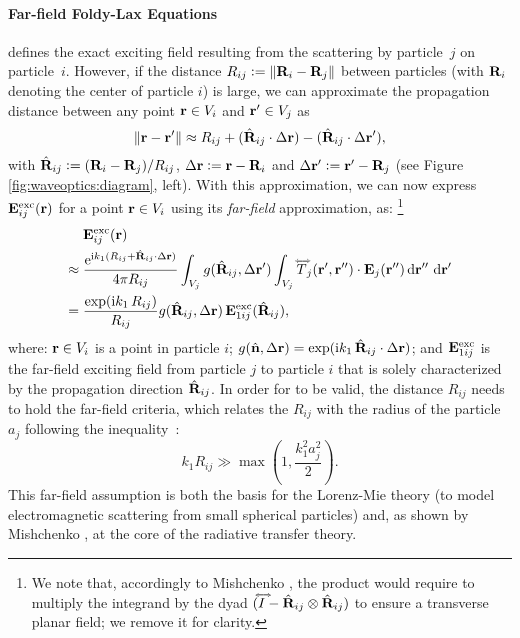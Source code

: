 

\paragraph{Far-field Foldy-Lax Equations}
 defines the exact exciting field resulting from the scattering by particle~$j$ on particle~$i$.
However, if the distance $R_{ij} \vcentcolon= \| \mathbf{R}_i - \mathbf{R}_j \|$ between particles (with $\mathbf{R}_i$ denoting the center of particle $i$) is large, we can approximate the propagation distance between any point $\mathbf{r} \in V_i$ and $\mathbf{r}' \in V_j$ as
\begin{equation}
    \| \mathbf{r} - \mathbf{r}' \| \approx R_{ij} + (\hat{\mathbf{R}}_{ij} \cdot {\Delta}\mathbf{r}) -  (\hat{\mathbf{R}}_{ij} \cdot {\Delta}\mathbf{r}'),
\end{equation}
with $\hat{\mathbf{R}}_{ij} \vcentcolon= (\mathbf{R}_i - \mathbf{R}_j)/R_{ij}$, ${\Delta}\mathbf{r} \vcentcolon= \mathbf{r} - \mathbf{R}_i$ and ${\Delta}\mathbf{r}' \vcentcolon= \mathbf{r}' - \mathbf{R}_j$ (see Figure \ref{fig:waveoptics:diagram}, left).
With this approximation, we can now express $\mathbf{E}^\mathrm{exc}_{ij}(\mathbf{r})$ for a point $\mathbf{r} \in V_i$ using its \emph{far-field} approximation, as:%
\footnote{We note that, accordingly to Mishchenko \cite{mishchenko2006multiple}, the product would require to multiply the integrand by the dyad $({\accentset{\Longleftrightarrow}{I}} - \hat{\mathbf{R}}_{ij}\otimes\hat{\mathbf{R}}_{ij})$ to ensure a transverse planar field; we remove it for clarity.}
\begin{equation}
    \begin{split}
        & \bfEe_{ij}(\bfr)\\
        \approx\;& \frac{\Exp^{\Img k_1 (R_{ij}+\hatbfR_{ij}\cdot{\Delta}\bfr)}}{4\pi R_{ij}} \int_{V_j} g(\hatbfR_{ij},{\Delta}\bfr') \int_{V_j} \dyad{T}_j(\bfr',\bfr'')\cdot \bfE_j(\bfr'') \intd \bfr''\,\intd \bfr' \\
        =\;& \frac{\exp(\Img k_1 \,R_{ij})}{R_{ij}} 
        g(\hatbfR_{ij}, \Delta \bfr) \,\bfEe_{1ij}(\hatbfR_{ij}),
    \end{split}
    \label{eq:excfieldfar}
    \raisetag{17pt}
\end{equation}
where: $\mathbf{r} \in V_i$ is a point in particle $i$; $g(\hat{\mathbf{n}}, \Delta \mathbf{r})=\exp(\mathrm{i} k_1 \,\hat{\mathbf{R}}_{ij}\cdot{\Delta}\mathbf{r})$; and $\mathbf{E}^\mathrm{exc}_{1ij}$ is the far-field exciting field from particle $j$ to particle $i$ that is solely characterized by the propagation direction $\hat{\mathbf{R}}_{ij}$. In order for  to be valid, the distance $R_{ij}$ needs to hold the far-field criteria, which relates the $R_{ij}$ with the radius of the particle $a_j$ following the inequality~\cite{mishchenko2006multiple}:
\begin{equation}
    k_1 R_{ij} \gg \max\left(1, \frac{k_1^2a_j^2}{2}\right).
    \label{eq:farfield}
\end{equation}
This far-field assumption is both the basis for the Lorenz-Mie theory \cite{hulst1981light} (to model electromagnetic scattering from small spherical particles) and, as shown by Mishchenko \cite{mishchenko2002vector}, at the core of the radiative transfer theory.

